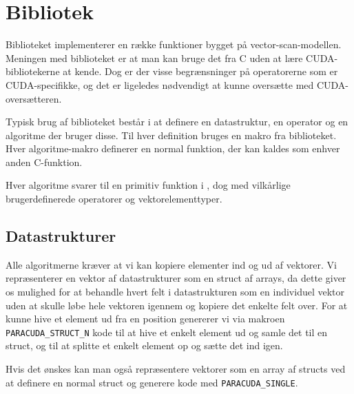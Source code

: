 

\section{Bibliotek}
\label{paracuda}

Biblioteket implementerer en række funktioner bygget på vector-scan-modellen.
Meningen med biblioteket er at man kan bruge det fra C uden at lære CUDA-bibliotekerne at kende.
Dog er der visse begrænsninger på operatorerne som er CUDA-specifikke, og det er ligeledes
nødvendigt at kunne oversætte med CUDA-oversætteren.

Typisk brug af biblioteket består i at definere en datastruktur, en operator og en 
algoritme der bruger disse. Til hver definition bruges en makro fra biblioteket.
Hver algoritme-makro definerer en normal funktion, der kan kaldes som enhver anden 
C-funktion.

Hver algoritme svarer til en primitiv funktion i \cite{ble}, dog med vilkårlige 
brugerdefinerede operatorer og vektorelementtyper.

\subsection{Datastrukturer}

Alle algoritmerne kræver at vi kan kopiere elementer ind og ud af vektorer.
Vi repræsenterer en vektor af datastrukturer som en struct af arrays, da dette
giver os mulighed for at behandle hvert felt i datastrukturen som en individuel
vektor uden at skulle løbe hele vektoren igennem og kopiere det enkelte felt 
over. For at kunne hive et element ud fra en position genererer vi via makroen 
\verb|PARACUDA_STRUCT_N| kode til at hive et enkelt element ud og samle det til 
en struct, og til at splitte et enkelt element op og sætte det ind igen.

Hvis det ønskes kan man også repræsentere vektorer som en array af structs ved
at definere en normal struct og generere kode med \verb|PARACUDA_SINGLE|.

